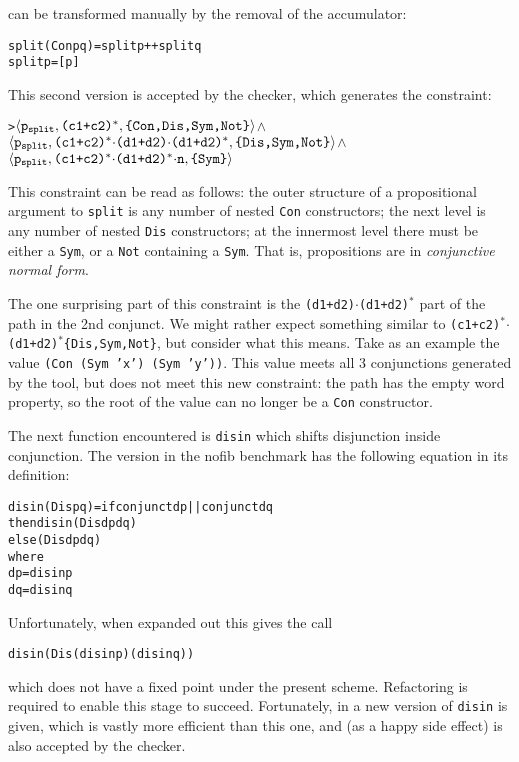 \documentclass[book]{tfp05symp}
\newcommand{\T}[1]{\texttt{#1}}
\newcommand{\tup}[1]{\ensuremath{\langle #1 \rangle}}
\renewcommand{\c}[3]{\tup{\T{#1},\T{#2},\T{\{#3\}}}}
\newcommand{\s}[1]{\ensuremath{_{\tt #1}}}
\newcommand{\K}{\ensuremath{^\ast}}
\newcommand{\D}{\ensuremath{\cdot}}
\newenvironment{code}{\begin{alltt}\small}{\end{alltt}}
\begin{document}
\noindent can be transformed manually by the removal of the
accumulator:

\begin{code}
split (Con p q) = split p ++ split q
split p = [p]
\end{code}

This second version is accepted by the checker, which generates the
constraint:

\begin{code}
> \c{p\s{split}}{(c1+c2)\K}{Con,Dis,Sym,Not} \(\wedge\)
  \c{p\s{split}}{(c1+c2)\K\D(d1+d2)\D(d1+d2)\K}{Dis,Sym,Not} \(\wedge\)
  \c{p\s{split}}{(c1+c2)\K\D(d1+d2)\K\D{}n}{Sym}
\end{code}

This constraint can be read as follows: the outer structure of a
propositional argument to \T{split} is any number of nested \T{Con}
constructors; the next level is any number of nested \T{Dis}
constructors; at the innermost level there must be either a \T{Sym},
or a \T{Not} containing a \T{Sym}. That is, propositions are in
\textit{conjunctive normal form}.

The one surprising part of this constraint is the
\T{(d1+d2)\D(d1+d2)\K} part of the path in the 2nd conjunct. We
might rather expect something similar to
\T{(c1+c2)\K\D(d1+d2)\K\{Dis,Sym,Not\}}, but consider what this
means. Take as an example the value \T{(Con (Sym 'x') (Sym 'y'))}.
This value meets all 3 conjunctions generated by the tool, but does
not meet this new constraint: the path has the empty word property,
so the root of the value can no longer be a \T{Con} constructor.

The next function encountered is \T{disin} which shifts
disjunction inside conjunction. The version in the nofib benchmark
has the following equation in its definition:

\begin{code}
disin (Dis p q) = if conjunct dp || conjunct dq
                  then disin (Dis dp dq)
                  else (Dis dp dq)
    where
    dp = disin p
    dq = disin q
\end{code}

Unfortunately, when expanded out this gives the call

\begin{code}
disin (Dis (disin p) (disin q))
\end{code}

\noindent which does not have a fixed point under the present
scheme. Refactoring is required to enable this stage to succeed.
Fortunately, in \cite{clausify} a new version of \T{disin} is given,
which is vastly more efficient than this one, and (as a happy side
effect) is also accepted by the checker.
\end{document}

